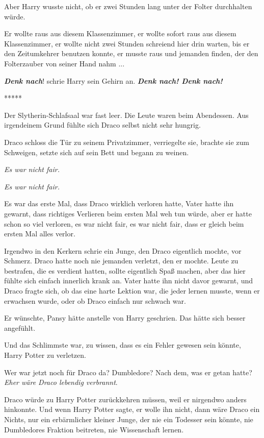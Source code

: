 Aber Harry wusste nicht, ob er zwei Stunden lang unter der Folter durchhalten
würde.

Er wollte raus aus diesem Klassenzimmer, er wollte sofort raus aus diesem
Klassenzimmer, er wollte nicht zwei Stunden schreiend hier drin warten, bis er
den Zeitumkehrer benutzen konnte, er musste raus und jemanden finden, der den
Folterzauber von seiner Hand nahm ...

\textbf{\emph{Denk nach}}! schrie Harry sein Gehirn an. \textbf{\emph{Denk nach!
Denk nach!}}

\begin{center}*****\end{center}

Der Slytherin-Schlafsaal war fast leer. Die Leute waren beim Abendessen. Aus
irgendeinem Grund fühlte sich Draco selbst nicht sehr hungrig.

Draco schloss die Tür zu seinem Privatzimmer, verriegelte sie, brachte sie zum
Schweigen, setzte sich auf sein Bett und begann zu weinen.

\emph{Es war nicht fair.}

\emph{Es war nicht fair.}

Es war das erste Mal, dass Draco wirklich verloren hatte, Vater hatte ihn
gewarnt, dass richtiges Verlieren beim ersten Mal weh tun würde, aber er hatte
schon so viel verloren, es war nicht fair, es war nicht fair, dass er gleich
beim ersten Mal alles verlor.

Irgendwo in den Kerkern schrie ein Junge, den Draco eigentlich mochte, vor
Schmerz. Draco hatte noch nie jemanden verletzt, den er mochte. Leute zu
bestrafen, die es verdient hatten, sollte eigentlich Spaß machen, aber das hier
fühlte sich einfach innerlich krank an. Vater hatte ihn nicht davor gewarnt, und
Draco fragte sich, ob das eine harte Lektion war, die jeder lernen musste, wenn
er erwachsen wurde, oder ob Draco einfach nur schwach war.

Er wünschte, Pansy hätte anstelle von Harry geschrien. Das hätte sich besser
angefühlt.

Und das Schlimmste war, zu wissen, dass es ein Fehler gewesen sein könnte, Harry
Potter zu verletzen.

Wer war jetzt noch für Draco da? Dumbledore? Nach dem, was er getan hatte?
\emph{Eher wäre Draco lebendig verbrannt}.

Draco würde zu Harry Potter zurückkehren müssen, weil er nirgendwo anders
hinkonnte. Und wenn Harry Potter sagte, er wolle ihn nicht, dann wäre Draco ein
Nichts, nur ein erbärmlicher kleiner Junge, der nie ein Todesser sein könnte,
nie Dumbledores Fraktion beitreten, nie Wissenschaft lernen.

